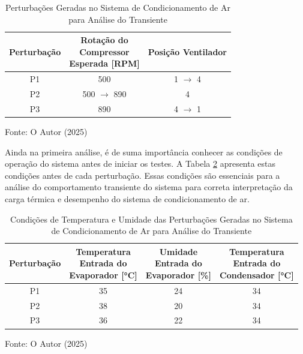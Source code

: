 \begin{table}[htb]
    \centering
\begin{tabular}{|c|c|c|}
    \hline
    \textbf{Perturbação} & 
    \makecell{\textbf{Rotação do} \\ \textbf{Compressor} \\ \textbf{Esperada [RPM]}} &
    \textbf{Posição Ventilador} \\
        \hline
        P1 & 500 & 1 $\rightarrow$ 4  \\
        P2 & 500 $\rightarrow$ 890 & 4  \\
        P3 & 890 & 4 $\rightarrow$ 1  \\
        \hline
    \end{tabular}
    \caption{Perturbações Geradas no Sistema de Condicionamento de Ar para Análise do Transiente}
    \vspace{5pt} 
{\footnotesize Fonte: O Autor (2025) }
    \label{tab:pertubaçõesTransiente}
\end{table}

Ainda na primeira análise, é de suma importância conhecer as condições de operação do sistema antes de iniciar os testes. A Tabela \ref{tab:pertubaçõesTransienteCondiçõesIniciais} apresenta estas condições antes de cada perturbação. Essas condições são essenciais para a análise do comportamento transiente do sistema para correta interpretação da carga térmica e desempenho do sistema de condicionamento de ar.


\begin{table}[htb]
    \centering
\begin{tabular}{|c|c|c|c|}
    \hline
    \textbf{Perturbação} & 
    \makecell{\textbf{Temperatura} \\ \textbf{Entrada do} \\ \textbf{Evaporador [°C]}} &
    \makecell{\textbf{Umidade} \\ \textbf{Entrada do} \\ \textbf{Evaporador [\%]}} &
    \makecell{\textbf{Temperatura} \\ \textbf{Entrada do} \\ \textbf{Condensador [°C]}} \\
        \hline
        P1 & 35 & 24 & 34 \\
        P2 & 38 & 20   & 34\\
        P3 & 36 & 22  & 34 \\
        \hline
    \end{tabular}
    \caption{Condições de Temperatura e Umidade das Perturbações Geradas no Sistema de Condicionamento de Ar para Análise do Transiente}
    \vspace{5pt} 
{\footnotesize Fonte: O Autor (2025) }
    \label{tab:pertubaçõesTransienteCondiçõesIniciais}
\end{table}

